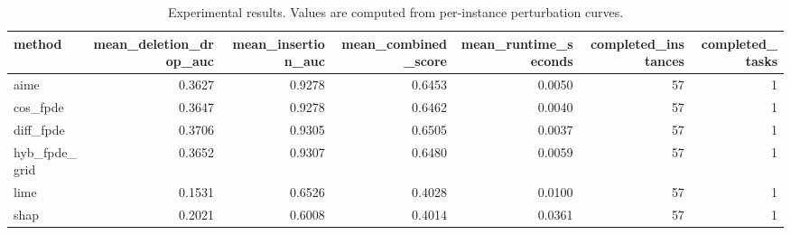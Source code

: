\begin{table}[t]
\caption{Experimental results. Values are computed from per-instance perturbation curves.}
\label{tab:main_results_computed}
\centering
\begin{tabular}{lrrrrrr}
\toprule
method & mean\_deletion\_drop\_auc & mean\_insertion\_auc & mean\_combined\_score & mean\_runtime\_seconds & completed\_instances & completed\_tasks \\
\midrule
aime & 0.3627 & 0.9278 & 0.6453 & 0.0050 & 57 & 1 \\
cos\_fpde & 0.3647 & 0.9278 & 0.6462 & 0.0040 & 57 & 1 \\
diff\_fpde & 0.3706 & 0.9305 & 0.6505 & 0.0037 & 57 & 1 \\
hyb\_fpde\_grid & 0.3652 & 0.9307 & 0.6480 & 0.0059 & 57 & 1 \\
lime & 0.1531 & 0.6526 & 0.4028 & 0.0100 & 57 & 1 \\
shap & 0.2021 & 0.6008 & 0.4014 & 0.0361 & 57 & 1 \\
\bottomrule
\end{tabular}

\end{table}
